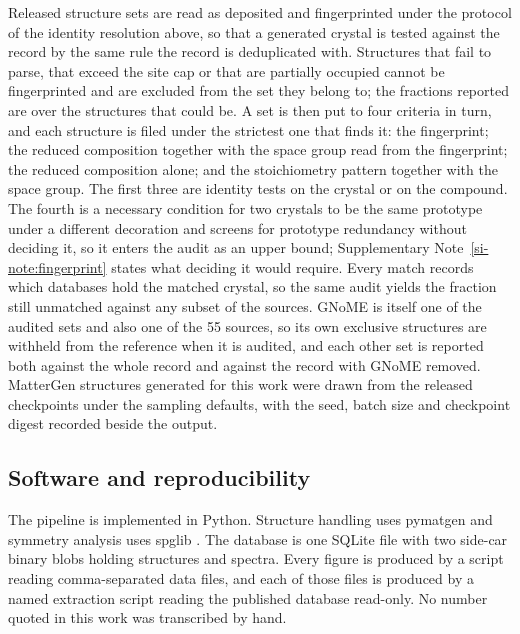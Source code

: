 Released structure sets are read as deposited and fingerprinted under the
protocol of the identity resolution above, so that a generated crystal is tested
against the record by the same rule the record is deduplicated with. Structures
that fail to parse, that exceed the site cap or that are partially occupied
cannot be fingerprinted and are excluded from the set they belong to; the
fractions reported are over the structures that could be. A set is then put to
four criteria in turn, and each structure is filed under the strictest one that
finds it: the fingerprint; the reduced composition together with the space group
read from the fingerprint; the reduced composition alone; and the stoichiometry
pattern together with the space group. The first three are identity tests on the
crystal or on the compound. The fourth is a necessary condition for two crystals
to be the same prototype under a different decoration and screens for prototype
redundancy without deciding it, so it enters the audit as an upper bound;
Supplementary Note~\ref{si-note:fingerprint} states what deciding it would
require. Every match records which databases hold the matched crystal, so the
same audit yields the fraction still unmatched against any subset of the
sources. GNoME is itself one of the audited sets and also one of the 55 sources,
so its own exclusive structures are withheld from the reference when it is
audited, and each other set is reported both against the whole record and
against the record with GNoME removed. MatterGen structures generated for this
work were drawn from the released checkpoints under the sampling defaults, with
the seed, batch size and checkpoint digest recorded beside the output.

\subsection{Software and reproducibility}

The pipeline is implemented in Python. Structure handling uses pymatgen
\cite{ong2013python} and symmetry analysis uses spglib \cite{togo2024spglib}. The
database is one SQLite file with two side-car binary blobs holding structures
and spectra. Every figure is produced by a script reading
comma-separated data files, and each of those files is produced by a named
extraction script reading the published database read-only. No number quoted in this
work was transcribed by hand.
